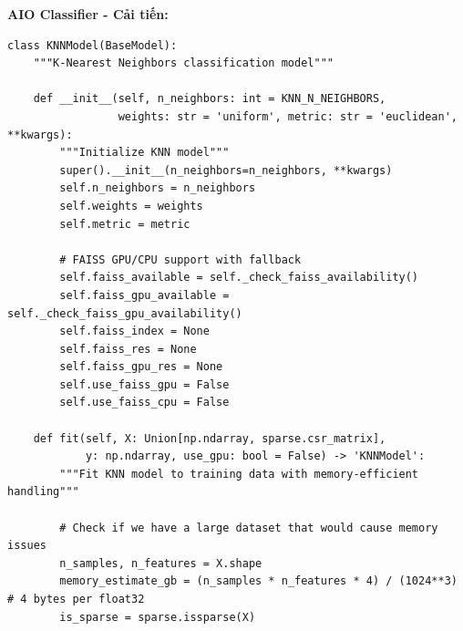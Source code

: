 \textbf{AIO Classifier - Cải tiến:}
\begin{verbatim}
class KNNModel(BaseModel):
    """K-Nearest Neighbors classification model"""
    
    def __init__(self, n_neighbors: int = KNN_N_NEIGHBORS, 
                 weights: str = 'uniform', metric: str = 'euclidean', **kwargs):
        """Initialize KNN model"""
        super().__init__(n_neighbors=n_neighbors, **kwargs)
        self.n_neighbors = n_neighbors
        self.weights = weights
        self.metric = metric
        
        # FAISS GPU/CPU support with fallback
        self.faiss_available = self._check_faiss_availability()
        self.faiss_gpu_available = self._check_faiss_gpu_availability()
        self.faiss_index = None
        self.faiss_res = None
        self.faiss_gpu_res = None
        self.use_faiss_gpu = False
        self.use_faiss_cpu = False
        
    def fit(self, X: Union[np.ndarray, sparse.csr_matrix], 
            y: np.ndarray, use_gpu: bool = False) -> 'KNNModel':
        """Fit KNN model to training data with memory-efficient handling"""
        
        # Check if we have a large dataset that would cause memory issues
        n_samples, n_features = X.shape
        memory_estimate_gb = (n_samples * n_features * 4) / (1024**3)  # 4 bytes per float32
        is_sparse = sparse.issparse(X)
        

\end{verbatim}

